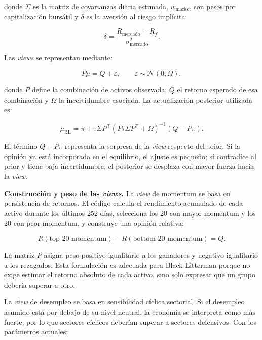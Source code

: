 donde $\Sigma$ es la matriz de covarianzas diaria estimada, $w_{\text{market}}$
son pesos por capitalizaci\'on burs\'atil y $\delta$ es la aversi\'on al riesgo
impl\'icita:

\begin{equation}
\delta =
\frac{R_{\text{mercado}} - R_f}{\sigma^2_{\text{mercado}}}.
\end{equation}

Las \textit{views} se representan mediante:

\begin{equation}
P\mu = Q + \varepsilon, \qquad \varepsilon \sim \mathcal{N}(0,\Omega),
\end{equation}

donde $P$ define la combinaci\'on de activos observada, $Q$ el retorno esperado
de esa combinaci\'on y $\Omega$ la incertidumbre asociada. La actualizaci\'on
posterior utilizada es:

\begin{equation}
\mu_{\text{BL}} =
\pi + \tau\Sigma P^\top
(P\tau\Sigma P^\top + \Omega)^{-1}
(Q - P\pi).
\end{equation}

El t\'ermino $Q - P\pi$ representa la sorpresa de la \textit{view} respecto del
prior. Si la opini\'on ya est\'a incorporada en el equilibrio, el ajuste es
peque\~no; si contradice al prior y tiene baja incertidumbre, el posterior se
desplaza con mayor fuerza hacia la \textit{view}.

\noindent\textbf{Construcci\'on y peso de las \textit{views}.}
La \textit{view} de momentum se basa en persistencia de retornos. El c\'odigo
calcula el rendimiento acumulado de cada activo durante los \'ultimos 252 d\'ias,
selecciona los 20 con mayor momentum y los 20 con peor momentum, y construye una
opini\'on relativa:

\begin{equation}
R(\text{top 20 momentum}) - R(\text{bottom 20 momentum}) = Q.
\end{equation}

La matriz $P$ asigna peso positivo igualitario a los ganadores y negativo
igualitario a los rezagados. Esta formulaci\'on es adecuada para Black-Litterman
porque no exige estimar el retorno absoluto de cada activo, sino solo expresar
que un grupo deber\'ia superar a otro.

La \textit{view} de desempleo se basa en sensibilidad c\'iclica sectorial. Si el
desempleo asumido est\'a por debajo de su nivel neutral, la econom\'ia se
interpreta como m\'as fuerte, por lo que sectores c\'iclicos deber\'ian superar a
sectores defensivos. Con los par\'ametros actuales:

